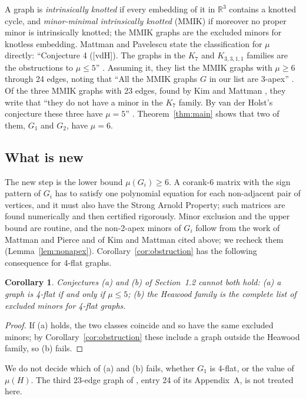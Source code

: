 \documentclass[11pt]{article}
\newtheorem{corollary}[theorem]{Corollary}
\theoremstyle{remark}
\begin{document}
A graph is \emph{intrinsically knotted} if every embedding of it in
$\mathbb{R}^3$ contains a knotted cycle, and \emph{minor-minimal
intrinsically knotted} (MMIK) if moreover no proper minor is intrinsically
knotted; the MMIK graphs are the excluded minors for knotless embedding.
Mattman and Pavelescu state the classification for $\mu$ directly:
``Conjecture 4 ([vdH]). The graphs in the $K_7$ and $K_{3,3,1,1}$
families are the obstructions to $\mu\le5$'' \cite[p.~3]{MP}. Assuming it,
they list the MMIK graphs with $\mu\ge6$ through 24 edges, noting that
``All the MMIK graphs $G$ in our list are 3-apex'' \cite[\S3]{MP}. Of the
three MMIK graphs with 23 edges, found by Kim and Mattman \cite{KM}, they
write that ``they do not have a minor in the $K_7$ family. By van der
Holst's conjecture these three have $\mu=5$'' \cite[\S3]{MP}.
Theorem~\ref{thm:main} shows that two of them, $G_1$ and $G_2$, have
$\mu=6$.

\subsection{What is new}
The new step is the lower bound $\mu(G_i)\ge 6$. A corank-6 matrix with
the sign pattern of $G_i$ has to satisfy one polynomial equation for each
non-adjacent pair of vertices, and it must also have the Strong Arnold
Property; such matrices are found numerically and then certified
rigorously. Minor exclusion and the upper bound are routine, and the
non-2-apex minors of $G_i$ follow from the work of Mattman and Pierce
\cite{MPi} and of Kim and Mattman \cite{KM} cited above; we recheck them
(Lemma~\ref{lem:nonapex}). Corollary~\ref{cor:obstruction} has the
following consequence for 4-flat graphs.

\begin{corollary}\label{cor:fourflat}
Conjectures (a) and (b) of Section~1.2 cannot both hold: (a) a graph is
4-flat if and only if $\mu\le5$; (b) the Heawood family is the complete
list of excluded minors for 4-flat graphs.
\end{corollary}

\begin{proof}
If (a) holds, the two classes coincide and so have the same excluded
minors; by Corollary~\ref{cor:obstruction} these include a graph outside
the Heawood family, so (b) fails.
\end{proof}

We do not decide which of (a) and (b) fails, whether $G_1$ is 4-flat, or
the value of $\mu(H)$. The third 23-edge graph of \cite[\S3]{MP}, entry 24
of its Appendix~A, is not treated here.
\end{document}
